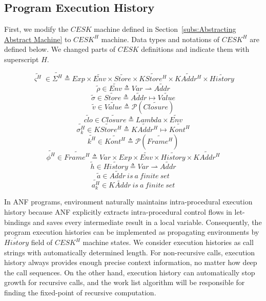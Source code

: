 \documentclass{article}
\begin{document}
\subsection{Program Execution History}
\label{sub:Program Execution History}
First, we modify the $CESK$ machine defined in Section~\ref{subs:Abstracting Abstract Machine} to $CESK^H$ machine.
Data types and notations of $CESK^H$ are defined below. We changed parts of $CESK$ definitions and indicate them with superscript $H$.

\[
\tag{states}
\widetilde{\varsigma^H}\in\widetilde{\Sigma^H} \triangleq Exp \times \widetilde{Env} \times \widetilde{Store}
\times \widetilde{KStore^H} \times \widetilde{KAddr^H} \times \widetilde{History}
\]
\[
\tag{environments}
\widetilde{\rho} \in \widetilde{Env} \triangleq Var \rightharpoonup \widetilde{Addr}
\]
\[
\tag{stores}
\widetilde{\sigma} \in \widetilde{Store} \triangleq \widetilde{Addr} \mapsto \widetilde{Value}
\]
\[
\tag{abstract values}
\widetilde{v} \in \widetilde{Value} \triangleq \mathcal{P}(\widetilde{Closure})
\]
\[
\tag{closures}
\widetilde{clo} \in \widetilde{Closure} \triangleq Lambda \times \widetilde{Env}
\]
\[
\tag{continuation stores}
\widetilde{\sigma_k^H} \in \widetilde{KStore^H} \triangleq  \widetilde{KAddr^H} \mapsto  \widetilde{Kont^H}
\]
\[
\tag{abstract continuations}
\widetilde{k^H} \in  \widetilde{Kont^H} \triangleq  \mathcal{P}(\widetilde{Frame^H})
\]
\[
\tag{stack frames}
\widetilde{\phi^H} \in  \widetilde{Frame^H} \triangleq Var \times Exp \times  \widetilde{Env} \times \widetilde{History} \times  \widetilde{KAddr^H}
\]
\[
\tag{histories}
\widetilde{h} \in \widetilde{History} \triangleq Var \rightharpoonup \widetilde{Addr}
\]
\[
\tag{value addresses}
\widetilde{a} \in \widetilde{Addr} \ is\ a\ finite\ set
\]
\[
\tag{continuation addresses}
\widetilde{a_k^H} \in \widetilde{KAddr} \ is\ a\ finite\ set
\]

In ANF programs, environment naturally maintains intra-procedural execution history because ANF explicitly extracts intra-procedural control flows in let-bindings and saves every intermediate result in a local variable.
Consequently, the program execution histories can be implemented as propagating environments by $\widetilde{History}$ field of $CESK^H$ machine states.
We consider execution histories as call strings with automatically determined length. For non-recursive calls, execution history always provides enough precise context information, no matter how deep the call sequences. On the other hand, execution history can automatically stop growth for recursive calls, and the work list algorithm will be responsible for finding the fixed-point of recursive computation.
\end{document}
